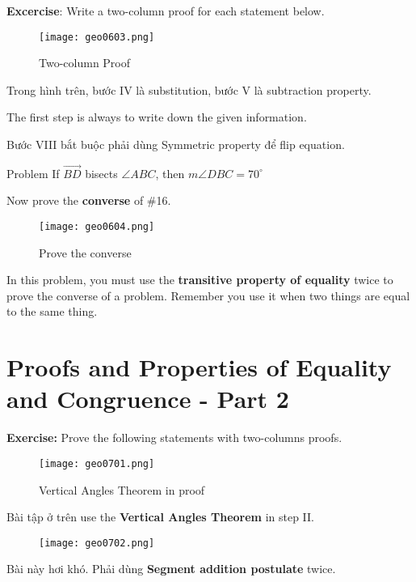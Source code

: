 \textbf{Excercise}: Write a two-column proof for each statement below.

\begin{figure}[htb!]
  \centering
  \texttt{[image: geo0603.png]}
  \caption{Two-column Proof}
\end{figure}

Trong hình trên, bước IV là substitution, bước V là subtraction property.

The first step is always to write down the given information.

Bước VIII bắt buộc phải dùng Symmetric property để flip equation.

\vspace{.5cm}

Problem  If $\overrightarrow{BD}$ bisects $\angle ABC$, then $m\angle DBC=70^{\circ}$

Now prove the \textbf{converse} of \#16.

\newpage

\begin{figure}[htb!]
  \centering
  \texttt{[image: geo0604.png]}
  \caption{Prove the converse}
\end{figure}

In this problem, you must use the \textbf{transitive property of equality} twice to prove the converse of a problem. Remember you use it when two things are equal to the same thing.

\section{Proofs and Properties of Equality and Congruence - Part 2}

\textbf{Exercise:} Prove the following statements with two-columns proofs.

\newpage

\begin{figure}[htb!]
  \centering
  \texttt{[image: geo0701.png]}
  \caption{Vertical Angles Theorem in proof}
\end{figure}

Bài tập ở trên use the \textbf{Vertical Angles Theorem} in step II.

\begin{figure}[htb!]
  \centering
  \texttt{[image: geo0702.png]}
\end{figure}

Bài này hơi khó. Phải dùng \textbf{Segment addition postulate} twice.

